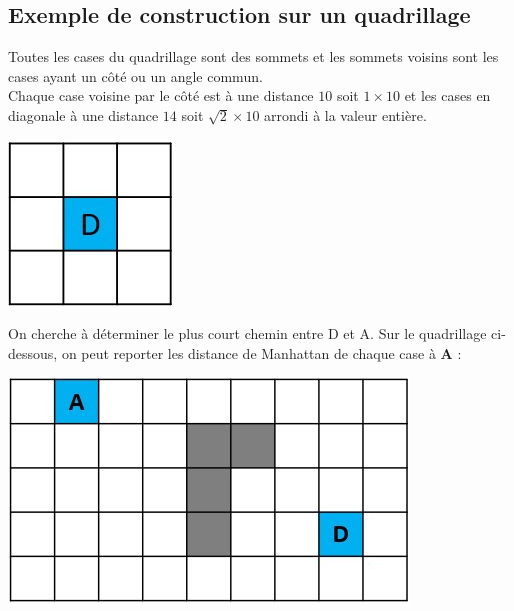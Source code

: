 \subsection{Exemple de construction sur un quadrillage}

\begin{minipage}[c]{.6\linewidth}
Toutes les cases du quadrillage sont des sommets et les sommets voisins sont les cases ayant un côté ou un angle commun.\\
Chaque case voisine par le côté est à une distance $10$ soit $1 \times 10$ et les cases en diagonale à une distance $14$ soit $\sqrt{2} \times 10$ arrondi à la valeur entière.\\
\end{minipage}
\hfill %
\begin{minipage}[c]{.35\linewidth}
\begin{center}
\includegraphics[scale=0.7]{images/quadri1.jpg}
\end{center}
\end{minipage}


On cherche à déterminer le plus court chemin entre D et A. Sur le quadrillage ci-dessous, on peut reporter les distance de Manhattan de chaque case à \textbf{A} : 

\begin{center}
\includegraphics[scale=0.8]{images/quadri2.jpg}
\end{center}

